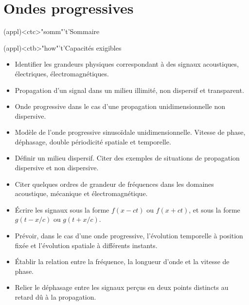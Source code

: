 \documentclass[../../main/main.tex]{subfiles}
\begin{document}
\setcounter{chapter}{0}


\chapter{Ondes progressives}

\vspace*{\fill}

\begin{tcn}(appl)<ctc>"somm"'t'{Sommaire}
	\let\item\olditem
	\vspace{-15pt}
	\minitoc
	\vspace{-25pt}
\end{tcn}

\begin{tcn}[sidebyside, fontupper=\small, fontlower=\small]
	(appl)<ctb>"how"'t'{Capacités exigibles}
	\begin{itemize}[label=\rcheck]
		\item Identifier les grandeurs physiques correspondant à
		      des signaux acoustiques, électriques, électromagnétiques.
		\item Propagation d'un signal dans un milieu illimité, non dispersif et
		      transparent.
		\item Onde progressive dans le cas d'une propagation unidimensionnelle non
		      dispersive.
		\item Modèle de l'onde progressive sinusoïdale unidimensionnelle. Vitesse
		      de phase, déphasage, double périodicité spatiale et temporelle.
		\item Définir un milieu dispersif. Citer des exemples de situations de
		      propagation dispersive et non dispersive.
	\end{itemize}
	\tcblower
	\begin{itemize}[label=\rcheck]
		\item Citer quelques ordres de grandeur de fréquences dans les domaines
		      acoustique, mécanique et électromagnétique.
		\item Écrire les signaux sous la forme $f(x-ct)$ ou $f(x+ct)$, et
		      sous la forme $g(t-x/c)$ ou $g(t+x/c)$.
		\item Prévoir, dans le cas d'une onde progressive, l'évolution temporelle
		      à position fixée et l'évolution spatiale à différents instants.
		\item Établir la relation entre la fréquence, la longueur d'onde et la
		      vitesse de phase.
		\item Relier le déphasage entre les signaux perçus en deux points
		      distincts au retard dû à la propagation.
	\end{itemize}
\end{tcn}
\end{document}
